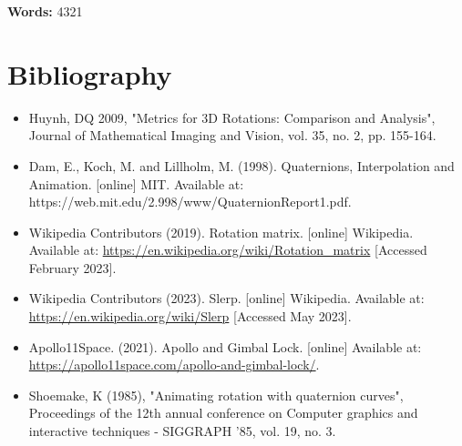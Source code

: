 \documentclass[12pt, a4paper]{article}
\begin{document}
\textbf{Words: } 4321

\pagebreak
\section{Bibliography}
\begin{itemize}[rightmargin=2cm]
    \item Huynh, DQ 2009, "Metrics for 3D Rotations: Comparison and Analysis", Journal of Mathematical Imaging and Vision, vol. 35, no. 2, pp. 155-164.
    \item Dam, E., Koch, M. and Lillholm, M. (1998). Quaternions, Interpolation
    and Animation. [online] MIT. Available at:
    https://web.mit.edu/2.998/www/QuaternionReport1.pdf.
    \item Wikipedia Contributors (2019). Rotation matrix. [online] Wikipedia. Available at: \url{https://en.wikipedia.org/wiki/Rotation_matrix} [Accessed February 2023].
    \item Wikipedia Contributors (2023). Slerp. [online] Wikipedia. Available at: \url{https://en.wikipedia.org/wiki/Slerp} [Accessed May 2023].
    \item Apollo11Space. (2021). Apollo and Gimbal Lock. [online] Available at: \url{https://apollo11space.com/apollo-and-gimbal-lock/}.
    \item Shoemake, K (1985), "Animating rotation with quaternion curves", Proceedings of the 12th annual conference on Computer graphics and interactive techniques  - SIGGRAPH ’85, vol. 19, no. 3.
\end{itemize}
\end{document}
